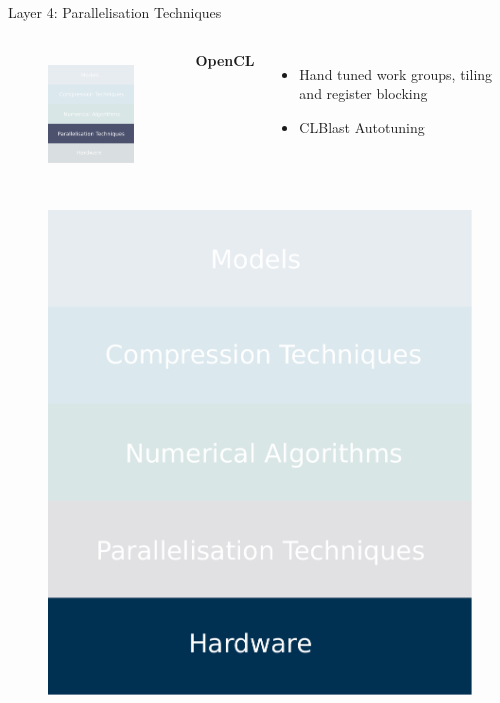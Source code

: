 \documentclass[xcolor=dvipsnames]{beamer}
\begin{document}
\begin{frame}{Layer 4: Parallelisation Techniques}

\begin{columns}


\begin{figure}
    \centering
    \includegraphics[width=3.5cm]{images/parallelisations.pdf}
    \label{fig:inference-stack-parallels-2}
\end{figure}


\textbf{OpenCL}
\begin{itemize}
    \item Hand tuned work groups, tiling and register blocking
    \item CLBlast Autotuning 
\end{itemize}

\end{columns}

\end{frame}

\begin{frame}

\begin{figure}
    \centering
    \includegraphics[width=0.6\linewidth]{images/hardwares.pdf}
\end{figure}
\end{frame}
\end{document}
